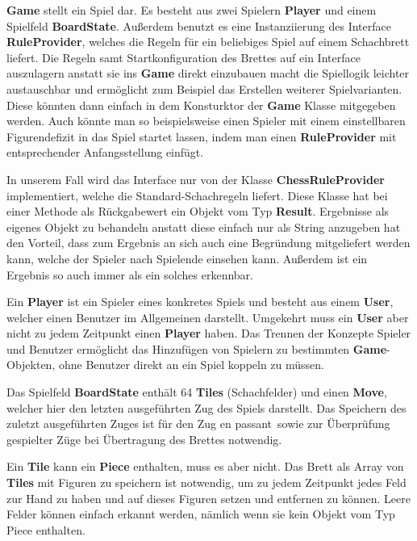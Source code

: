 \documentclass[parskip=full]{scrartcl}
\begin{document}
				\begin{description}
					\item \textbf{Game} stellt ein Spiel dar. Es besteht aus zwei Spielern \textbf{Player} und einem Spielfeld \textbf{BoardState}. Außerdem benutzt es eine Instanziierung des Interface \textbf{RuleProvider}, welches die Regeln für ein beliebiges Spiel auf einem Schachbrett liefert. Die Regeln samt Startkonfiguration des Brettes auf ein Interface auszulagern anstatt sie ins \textbf{Game} direkt einzubauen macht die Spiellogik leichter austauschbar und ermöglicht zum Beispiel das Erstellen weiterer Spielvarianten. Diese könnten dann einfach in dem Konsturktor der \textbf{Game} Klasse mitgegeben werden. Auch könnte man so beispielsweise einen Spieler mit einem einstellbaren Figurendefizit in das Spiel startet lassen, indem man einen \textbf{RuleProvider} mit entsprechender Anfangsstellung einfügt.
					\item In unserem Fall wird das Interface nur von der Klasse \textbf{ChessRuleProvider} implementiert, welche die Standard-Schachregeln liefert. Diese Klasse hat bei einer Methode als Rückgabewert ein Objekt vom Typ \textbf{Result}. Ergebnisse als eigenes Objekt zu behandeln anstatt diese einfach nur als String anzugeben hat den Vorteil, dass zum Ergebnis an sich auch eine Begründung mitgeliefert werden kann, welche der Spieler nach Spielende einsehen kann. Außerdem ist ein Ergebnis so auch immer als ein solches erkennbar.
					\item Ein \textbf{Player} ist ein Spieler eines konkretes Spiels und besteht aus einem \textbf{User}, welcher einen Benutzer im Allgemeinen darstellt. Umgekehrt muss ein \textbf{User} aber nicht zu jedem Zeitpunkt einen \textbf{Player} haben. Das Trennen der Konzepte Spieler und Benutzer ermöglicht das Hinzufügen von Spielern zu bestimmten \textbf{Game}-Objekten, ohne Benutzer direkt an ein Spiel koppeln zu müssen.
					\item Das Spielfeld \textbf{BoardState} enthält 64  \textbf{Tiles} (Schachfelder) und einen \textbf{Move}, welcher hier den letzten ausgeführten Zug des Spiels darstellt. Das Speichern des zuletzt ausgeführten Zuges ist für den Zug \glqq en passant\grqq\ sowie zur Überprüfung gespielter Züge bei Übertragung des Brettes notwendig.
					\item Ein \textbf{Tile} kann ein \textbf{Piece} enthalten, muss es aber nicht. Das Brett als Array von \textbf{Tiles} mit Figuren zu speichern ist notwendig, um zu jedem Zeitpunkt jedes Feld zur Hand zu haben und auf dieses Figuren setzen und entfernen zu können. Leere Felder können einfach erkannt werden, nämlich wenn sie kein Objekt vom Typ Piece enthalten.

\end{description}
\end{document}
